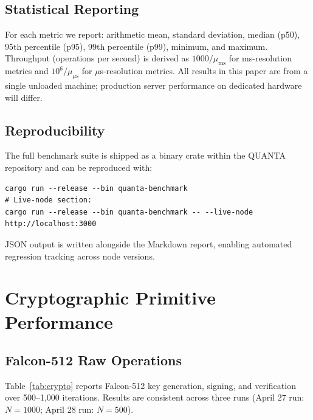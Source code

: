 \documentclass[11pt,a4paper]{article}
\begin{document}
\subsection{Statistical Reporting}

For each metric we report: arithmetic mean, standard deviation, median (p50),
95th percentile (p95), 99th percentile (p99), minimum, and maximum. Throughput
(operations per second) is derived as $1000 / \mu_{\mathrm{ms}}$ for
ms-resolution metrics and $10^6 / \mu_{\mu\mathrm{s}}$ for $\mu$s-resolution
metrics. All results in this paper are from a single unloaded machine;
production server performance on dedicated hardware will differ.

\subsection{Reproducibility}

The full benchmark suite is shipped as a binary crate within the QUANTA
repository and can be reproduced with:
\begin{lstlisting}
cargo run --release --bin quanta-benchmark
# Live-node section:
cargo run --release --bin quanta-benchmark -- --live-node http://localhost:3000
\end{lstlisting}
JSON output is written alongside the Markdown report, enabling automated
regression tracking across node versions.

\section{Cryptographic Primitive Performance}
\label{sec:crypto}
\subsection{Falcon-512 Raw Operations}

Table~\ref{tab:crypto} reports Falcon-512 key generation, signing, and
verification over 500--1,000 iterations. Results are consistent across three
runs (April 27 run: $N=1000$; April 28 run: $N=500$).
\end{document}
